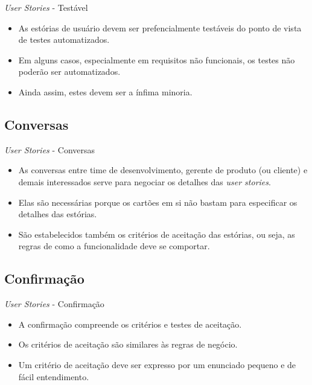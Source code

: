 \documentclass[11pt]{beamer}
\begin{document}
   \begin{frame}{\textit{User Stories} - Testável}
      \begin{itemize}
         \item As estórias de usuário devem ser prefencialmente testáveis do ponto de vista de testes automatizados.
         \item Em alguns casos, especialmente em requisitos não funcionais, os testes não poderão ser automatizados.
         \item  Ainda assim, estes devem ser a ínfima minoria.
      \end{itemize}
   \end{frame}

   \subsection{Conversas}

   \begin{frame}{\textit{User Stories} - Conversas}
      \begin{itemize}
         \item As conversas entre time de desenvolvimento, gerente de produto (ou cliente) e demais interessados serve para negociar os detalhes das \textit{user stories}.
         \item Elas são necessárias porque os cartões em si não bastam para especificar os detalhes das estórias.
         \item São estabelecidos também os critérios de aceitação das estórias, ou seja, as regras de como a funcionalidade deve se comportar.
      \end{itemize}
   \end{frame}

   \subsection{Confirmação}

   \begin{frame}{\textit{User Stories} - Confirmação}
      \begin{itemize}
         \item A confirmação compreende os critérios e testes de aceitação.
         \item Os critérios de aceitação são similares às regras de negócio.
         \item Um critério de aceitação deve ser expresso por um enunciado pequeno e de fácil entendimento.
      \end{itemize}
   \end{frame}
\end{document}
